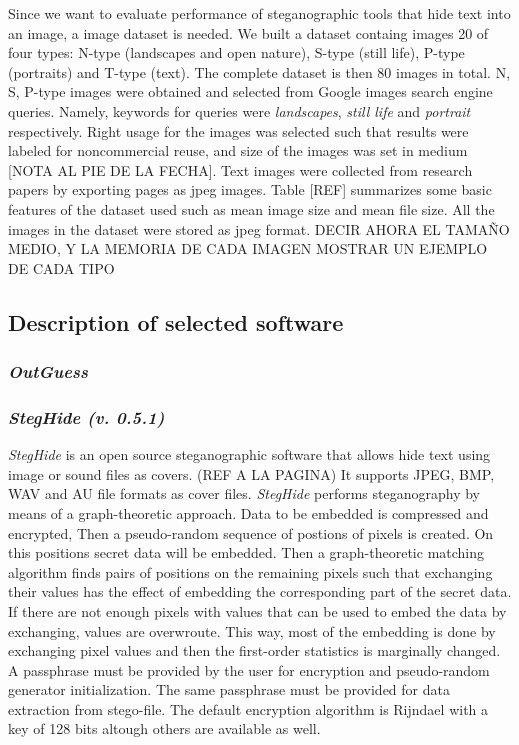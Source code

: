 \documentclass[11pt]{article}
\begin{document}
Since we want to evaluate performance of steganographic tools that hide text into an image, a image dataset is needed.
We built a dataset containg images 20 of four types: N-type (landscapes and open nature), S-type (still life), P-type (portraits) and
T-type (text). The complete dataset is then 80 images in total. N, S, P-type images were obtained and selected from Google images search engine queries.
Namely, keywords for queries were \textit{landscapes}, \textit{still life} and \textit{portrait} respectively.
Right usage for the images was selected such that results were labeled for noncommercial reuse, and size of the images was set in 
medium [NOTA AL PIE DE LA FECHA]. Text images were collected from research papers by exporting pages as jpeg images.
Table [REF] summarizes some basic features of the dataset used such as mean image size and mean file size. All the
images in the dataset were stored as jpeg format. DECIR AHORA EL TAMAÑO MEDIO, Y LA MEMORIA DE CADA IMAGEN
MOSTRAR UN EJEMPLO DE CADA TIPO



\subsection{Description of selected software}

\subsubsection{\textit{OutGuess}}

\subsubsection{\textit{}}

\subsubsection{\textit{StegHide (v. 0.5.1)}}
\textit{StegHide} is an open source steganographic software that allows hide text using image or sound files as covers. (REF A LA PAGINA)
It supports JPEG, BMP, WAV and AU file formats as cover files. 
\textit{StegHide} performs steganography by means of a graph-theoretic approach. Data to be embedded is compressed and encrypted,
Then a pseudo-random sequence of postions of pixels is created. On this positions secret data will be embedded. Then a
graph-theoretic  matching  algorithm finds pairs of positions on the remaining pixels such that exchanging their values has
the effect of embedding the corresponding  part of the secret data. If there are not enough pixels with values that can be used
to embed the data by exchanging, values are overwroute. This way, most of the embedding  is  done  by  exchanging  pixel  values
and then the first-order statistics is marginally changed. A passphrase must be provided by the user for encryption and
pseudo-random generator initialization. The same passphrase must be provided for data extraction from stego-file. The default
encryption algorithm is Rijndael with a key of 128 bits altough others are available as well.
\end{document}
